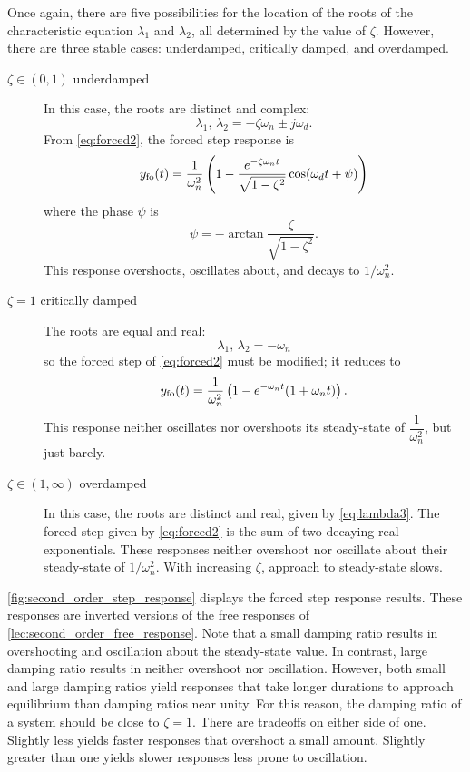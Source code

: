 \documentclass[dynamic_systems.tex]{subfiles}
\begin{document}
Once again, there are five possibilities for the location of the roots of the characteristic equation $\lambda_1$ and $\lambda_2$, all determined by the value of $\zeta$.
However, there are three stable cases: underdamped, critically damped, and overdamped.
\begin{description}
	\item[$\zeta\in(0,1)$ underdamped]
	In this case, the roots are distinct and complex: 
	\begin{equation}
		\lambda_1 \text{, } \lambda_2 = -\zeta \omega_n \pm j \omega_d.
	\end{equation}
	From \autoref{eq:forced2}, the forced step response is
	\begin{align}
		y_\textnormal{fo}(t) = 
		\dfrac{1}{\omega_n^2} 
		\left ( 
			1 - \dfrac{e^{-\zeta \omega_n t}}{\sqrt{1-\zeta^2}} 
			\cos(\omega_d t + \psi) 
		\right )
	\end{align}
	where the phase $\psi$ is
	\begin{equation}
		\psi =  -\arctan\dfrac{\zeta}{\sqrt{1-\zeta^2}}.
	\end{equation}
	This response overshoots, oscillates about, and decays to $1/\omega_n^2$.
	\item[$\zeta=1$ critically damped]
	The roots are equal and real:
	\begin{equation}
		\lambda_1 \text{, } \lambda_2 = -\omega_n
	\end{equation}
	so the forced step of \autoref{eq:forced2} must be modified; it reduces to
	\begin{align}
		y_\textnormal{fo}(t) = 
		\dfrac{1}{\omega_n^2} 
		\left ( 
			1 - e^{-\omega_n t} (1+\omega_n t)
		\right ).
	\end{align}
	This response neither oscillates nor overshoots its steady-state of $\dfrac{1}{\omega_n^2}$, but just barely.
	\item[$\zeta\in(1,\infty)$ overdamped]
	In this case, the roots are distinct and real, given by \autoref{eq:lambda3}.
	The forced step given by \autoref{eq:forced2} is the sum of two decaying real exponentials.
	These responses neither overshoot nor oscillate about their steady-state of $1/\omega_n^2$.
	With increasing $\zeta$, approach to steady-state slows.
\end{description}

\autoref{fig:second_order_step_response} displays the forced step response results.
These responses are inverted versions of the free responses of \autoref{lec:second_order_free_response}.
Note that a small damping ratio results in overshooting and oscillation about the steady-state value.
In contrast, large damping ratio results in neither overshoot nor oscillation.
However, both small and large damping ratios yield responses that take longer durations to approach equilibrium than damping ratios near unity.
For this reason, the damping ratio of a system should be close to $\zeta=1$.
There are tradeoffs on either side of one.
Slightly less yields faster responses that overshoot a small amount.
Slightly greater than one yields slower responses less prone to oscillation.
\end{document}
